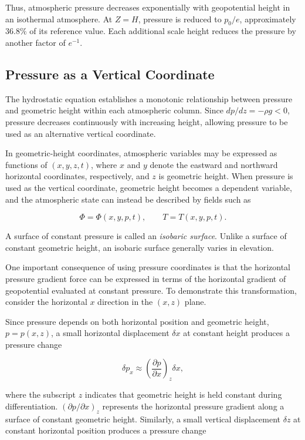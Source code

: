 \documentclass[10pt,twocolumn]{memoir}
\begin{document}
Thus, atmospheric pressure decreases exponentially with geopotential height in an isothermal atmosphere. At $Z=H$, pressure is reduced to $p_0/e$, approximately $36.8\%$ of its reference value. Each additional scale height reduces the pressure by another factor of $e^{-1}$.

\subsection{Pressure as a Vertical Coordinate}

The hydrostatic equation establishes a monotonic relationship between pressure and geometric height within each atmospheric column. Since $dp/dz=-\rho g<0$, pressure decreases continuously with increasing height, allowing pressure to be used as an alternative vertical coordinate.

In geometric-height coordinates, atmospheric variables may be expressed as functions of $(x,y,z,t)$, where $x$ and $y$ denote the eastward and northward horizontal coordinates, respectively, and $z$ is geometric height. When pressure is used as the vertical coordinate, geometric height becomes a dependent variable, and the atmospheric state can instead be described by fields such as

\begin{equation}
    \Phi=\Phi(x,y,p,t), \qquad T=T(x,y,p,t).
\end{equation}

A surface of constant pressure is called an \textit{isobaric surface}. Unlike a surface of constant geometric height, an isobaric surface generally varies in elevation.

One important consequence of using pressure coordinates is that the horizontal pressure gradient force can be expressed in terms of the horizontal gradient of geopotential evaluated at constant pressure. To demonstrate this transformation, consider the horizontal $x$ direction in the $(x,z)$ plane.

Since pressure depends on both horizontal position and geometric height, $p=p(x,z)$, a small horizontal displacement $\delta x$ at constant height produces a pressure change

\begin{equation}
    \delta p_x \approx \left(\frac{\partial p}{\partial x}\right)_z\delta x,
\end{equation}

where the subscript $z$ indicates that geometric height is held constant during differentiation. $(\partial p/\partial x)_z$ represents the horizontal pressure gradient along a surface of constant geometric height. Similarly, a small vertical displacement $\delta z$ at constant horizontal position produces a pressure change
\end{document}
